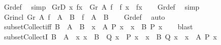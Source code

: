 \begin{isabellebody}
%
\isatagproof
{}\isamarkupfalse%
\ Gr{\isacharunderscore}{\kern0pt}def\ \isamarkupfalse%
\ simp%
\endisatagproof
{\isafoldproof}%
%
\isadelimproof
\isanewline
%
\endisadelimproof
\isanewline
{}\isamarkupfalse%
\ GrD{}{\isacharcolon}{\kern0pt}\ {\isachardoublequoteopen}{\isacharparenleft}{\kern0pt}x{\isacharcomma}{\kern0pt}\ fx{\isacharparenright}{\kern0pt}\ {\isasymin}\ Gr\ A\ f\ {\isasymLongrightarrow}\ f\ x\ {\isacharequal}{\kern0pt}\ fx{\isachardoublequoteclose}\isanewline
%
\isadelimproof
\ \ %
\endisadelimproof
%
\isatagproof
{}\isamarkupfalse%
\ Gr{\isacharunderscore}{\kern0pt}def\ \isamarkupfalse%
\ simp%
\endisatagproof
{\isafoldproof}%
%
\isadelimproof
\isanewline
%
\endisadelimproof
\isanewline
{}\isamarkupfalse%
\ Gr{\isacharunderscore}{\kern0pt}incl{\isacharcolon}{\kern0pt}\ {\isachardoublequoteopen}Gr\ A\ f\ {\isasymsubseteq}\ A\ {\isasymtimes}\ B\ {\isasymlongleftrightarrow}\ f\ {\isacharbackquote}{\kern0pt}\ A\ {\isasymsubseteq}\ B{\isachardoublequoteclose}\isanewline
%
\isadelimproof
\ \ %
\endisadelimproof
%
\isatagproof
{}\isamarkupfalse%
\ Gr{\isacharunderscore}{\kern0pt}def\ \isamarkupfalse%
\ auto%
\endisatagproof
{\isafoldproof}%
%
\isadelimproof
\isanewline
%
\endisadelimproof
\isanewline
{}\isamarkupfalse%
\ subset{\isacharunderscore}{\kern0pt}Collect{\isacharunderscore}{\kern0pt}iff{\isacharcolon}{\kern0pt}\ {\isachardoublequoteopen}B\ {\isasymsubseteq}\ A\ {\isasymLongrightarrow}\ {\isacharparenleft}{\kern0pt}B\ {\isasymsubseteq}\ {\isacharbraceleft}{\kern0pt}x\ {\isasymin}\ A{\isachardot}{\kern0pt}\ P\ x{\isacharbraceright}{\kern0pt}{\isacharparenright}{\kern0pt}\ {\isacharequal}{\kern0pt}\ {\isacharparenleft}{\kern0pt}{\isasymforall}x\ {\isasymin}\ B{\isachardot}{\kern0pt}\ P\ x{\isacharparenright}{\kern0pt}{\isachardoublequoteclose}\isanewline
%
\isadelimproof
\ \ %
\endisadelimproof
%
\isatagproof
{}\isamarkupfalse%
\ blast%
\endisatagproof
{\isafoldproof}%
%
\isadelimproof
\isanewline
%
\endisadelimproof
\isanewline
{}\isamarkupfalse%
\ subset{\isacharunderscore}{\kern0pt}CollectI{\isacharcolon}{\kern0pt}\ {\isachardoublequoteopen}B\ {\isasymsubseteq}\ A\ {\isasymLongrightarrow}\ {\isacharparenleft}{\kern0pt}{\isasymAnd}x{\isachardot}{\kern0pt}\ x\ {\isasymin}\ B\ {\isasymLongrightarrow}\ Q\ x\ {\isasymLongrightarrow}\ P\ x{\isacharparenright}{\kern0pt}\ {\isasymLongrightarrow}\ {\isacharparenleft}{\kern0pt}{\isacharbraceleft}{\kern0pt}x\ {\isasymin}\ B{\isachardot}{\kern0pt}\ Q\ x{\isacharbraceright}{\kern0pt}\ {\isasymsubseteq}\ {\isacharbraceleft}{\kern0pt}x\ {\isasymin}\ A{\isachardot}{\kern0pt}\ P\ x{\isacharbraceright}{\kern0pt}{\isacharparenright}{\kern0pt}{\isachardoublequoteclose}\isanewline

\end{isabellebody}
